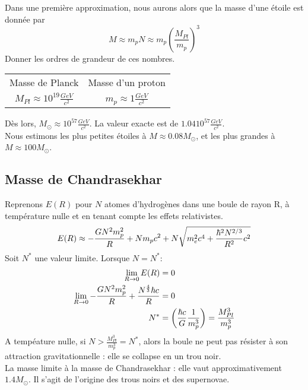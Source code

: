 \documentclass[../Notes de cours]{subfiles}
\begin{document}
Dans une première approximation, nous aurons alors que la masse d'une étoile est donnée par 
\begin{equation}
M \approx m_p N \approx m_p \left( \frac{M_{Pl}}{m_p} \right)^3
\end{equation}
Donner les ordres de grandeur de ces nombres.
\begin{center}
\begin{tabular}{c c}
Masse de Planck & Masse d'un proton\\
$M_{Pl} \approx 10^{19} \frac{GeV}{c^2}$ & $m_p \approx 1 \frac{GeV}{c^2}$
\end{tabular}
\end{center}
Dès lors, $ M_\odot \approx 10^{57} \frac{GeV}{c^2}$. La valeur exacte est de $1.04 10^{57} \frac{GeV}{c^2}$.\\

Nous estimons les plus petites étoiles à $M \approx 0.08 M_\odot$, et les plus grandes à $M \approx 100 M_\odot$.


\subsection{Masse de Chandrasekhar}
Reprenons $E(R)$ pour $N$ atomes d'hydrogènes dans une boule de rayon R, à température nulle et en tenant compte les effets relativistes.
\begin{equation}
E(R) \approx - \frac{GN^2 m_p^2}{R} + N m_p c^2 + N \sqrt{m_e^2c^4 + \frac{\hbar^2N^{2/3}}{R^2}c^2}
\end{equation}
Soit $N^*$ une valeur limite. Lorsque $N = N^*$:
\begin{align}
\lim_{R\to 0} E(R) &= 0\\
\lim_{R\to 0} - \frac{GN^2 m_p^2}{R} + \frac{N^{\frac{4}{3}}\hbar c}{R} &= 0\\
N^* &= \left( \frac{\hbar c}{G} \frac{1}{m_p^3} \right) = \frac{M_{Pl}^3}{m_p^3}
\end{align}
A tempéature nulle, si $N > \frac{M_{Pl}^3}{m_p^3} = N^*$, alors la boule ne peut pas résister à son attraction gravitationnelle : elle se collapse en un trou noir.\\

La masse limite à la masse de Chandrasekhar : elle vaut approximativement $1.4 M_\odot$. Il s'agit de l'origine des trous noirs et des supernovae.
\end{document}
